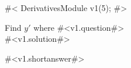

#<
DerivativesModule v1(5);
#>


Find $y'$ where #<v1.question#> \\



#<v1.solution#>



#<v1.shortanswer#>



